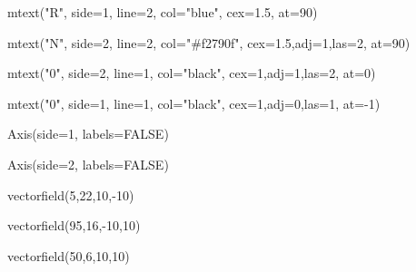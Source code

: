 \documentclass[
  a4paper,
]{scrbook}
\newenvironment{Shaded}{\begin{snugshade}}{\end{snugshade}}
\newcommand{\AttributeTok}[1]{\textcolor[rgb]{0.40,0.45,0.13}{#1}}
\newcommand{\ConstantTok}[1]{\textcolor[rgb]{0.56,0.35,0.01}{#1}}
\newcommand{\DecValTok}[1]{\textcolor[rgb]{0.68,0.00,0.00}{#1}}
\newcommand{\FloatTok}[1]{\textcolor[rgb]{0.68,0.00,0.00}{#1}}
\newcommand{\FunctionTok}[1]{\textcolor[rgb]{0.28,0.35,0.67}{#1}}
\newcommand{\NormalTok}[1]{\textcolor[rgb]{0.00,0.23,0.31}{#1}}
\newcommand{\SpecialCharTok}[1]{\textcolor[rgb]{0.37,0.37,0.37}{#1}}
\newcommand{\StringTok}[1]{\textcolor[rgb]{0.13,0.47,0.30}{#1}}
\theoremstyle{definition}
\theoremstyle{remark}
\begin{document}
\begin{Shaded}
\begin{Highlighting}[]
\FunctionTok{mtext}\NormalTok{(}\StringTok{"R"}\NormalTok{, }\AttributeTok{side=}\DecValTok{1}\NormalTok{, }\AttributeTok{line=}\DecValTok{2}\NormalTok{, }\AttributeTok{col=}\StringTok{"blue"}\NormalTok{, }\AttributeTok{cex=}\FloatTok{1.5}\NormalTok{, }\AttributeTok{at=}\DecValTok{90}\NormalTok{)}

\FunctionTok{mtext}\NormalTok{(}\StringTok{"N"}\NormalTok{, }\AttributeTok{side=}\DecValTok{2}\NormalTok{, }\AttributeTok{line=}\DecValTok{2}\NormalTok{, }\AttributeTok{col=}\StringTok{"\#f2790f"}\NormalTok{, }\AttributeTok{cex=}\FloatTok{1.5}\NormalTok{,}\AttributeTok{adj=}\DecValTok{1}\NormalTok{,}\AttributeTok{las=}\DecValTok{2}\NormalTok{, }\AttributeTok{at=}\DecValTok{90}\NormalTok{)}

\FunctionTok{mtext}\NormalTok{(}\StringTok{"0"}\NormalTok{, }\AttributeTok{side=}\DecValTok{2}\NormalTok{, }\AttributeTok{line=}\DecValTok{1}\NormalTok{, }\AttributeTok{col=}\StringTok{"black"}\NormalTok{, }\AttributeTok{cex=}\DecValTok{1}\NormalTok{,}\AttributeTok{adj=}\DecValTok{1}\NormalTok{,}\AttributeTok{las=}\DecValTok{2}\NormalTok{, }\AttributeTok{at=}\DecValTok{0}\NormalTok{)}

\FunctionTok{mtext}\NormalTok{(}\StringTok{"0"}\NormalTok{, }\AttributeTok{side=}\DecValTok{1}\NormalTok{, }\AttributeTok{line=}\DecValTok{1}\NormalTok{, }\AttributeTok{col=}\StringTok{"black"}\NormalTok{, }\AttributeTok{cex=}\DecValTok{1}\NormalTok{,}\AttributeTok{adj=}\DecValTok{0}\NormalTok{,}\AttributeTok{las=}\DecValTok{1}\NormalTok{, }\AttributeTok{at=}\SpecialCharTok{{-}}\DecValTok{1}\NormalTok{)}

\FunctionTok{Axis}\NormalTok{(}\AttributeTok{side=}\DecValTok{1}\NormalTok{, }\AttributeTok{labels=}\ConstantTok{FALSE}\NormalTok{)}

\FunctionTok{Axis}\NormalTok{(}\AttributeTok{side=}\DecValTok{2}\NormalTok{, }\AttributeTok{labels=}\ConstantTok{FALSE}\NormalTok{)}

\FunctionTok{vectorfield}\NormalTok{(}\DecValTok{5}\NormalTok{,}\DecValTok{22}\NormalTok{,}\DecValTok{10}\NormalTok{,}\SpecialCharTok{{-}}\DecValTok{10}\NormalTok{)}

\FunctionTok{vectorfield}\NormalTok{(}\DecValTok{95}\NormalTok{,}\DecValTok{16}\NormalTok{,}\SpecialCharTok{{-}}\DecValTok{10}\NormalTok{,}\DecValTok{10}\NormalTok{)}

\FunctionTok{vectorfield}\NormalTok{(}\DecValTok{50}\NormalTok{,}\DecValTok{6}\NormalTok{,}\DecValTok{10}\NormalTok{,}\DecValTok{10}\NormalTok{)}


\end{Highlighting}
\end{Shaded}
\end{document}
